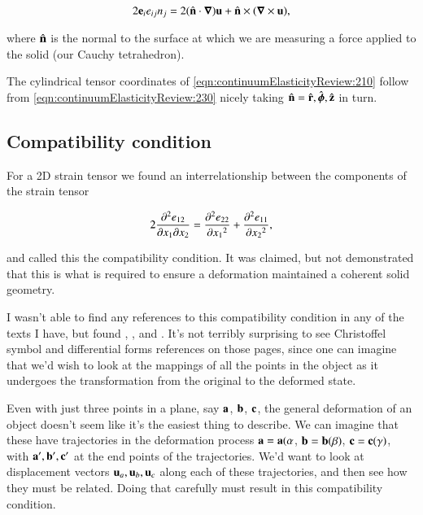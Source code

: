 \begin{equation}\label{eqn:continuumElasticityReview:230}
2 \Be_i e_{ij} n_j = 2 (\ncap \cdot \spacegrad) \Bu + \ncap \cross (\spacegrad \cross \Bu),
\end{equation}

where $\ncap$ is the normal to the surface at which we are measuring a force applied to the solid (our Cauchy tetrahedron).

The cylindrical tensor coordinates of \ref{eqn:continuumElasticityReview:210} follow from 
\ref{eqn:continuumElasticityReview:230} nicely taking $\ncap = \rcap, \phicap, \zcap$ in turn.

\subsection{Compatibility condition}

For a 2D strain tensor we found an interrelationship between the components of the strain tensor

\begin{equation}\label{eqn:continuumElasticityReview:510}
2 \frac{\partial^2 e_{12}}{\partial x_1 \partial x_2} 
=
\PDSq{x_1}{e_{22}} 
+\PDSq{x_2}{e_{11}},
\end{equation}

and called this the compatibility condition.  It was claimed, but not demonstrated that this is what is required to ensure a deformation maintained a coherent solid geometry.

I wasn't able to find any references to this compatibility condition in any of the texts I have, but found \cite{wiki:compatibilityMechanics}, \cite{wiki:infinitesimalStrainTheory}, and \cite{wiki:saintVenantCompat}.  It's not terribly surprising to see Christoffel symbol and differential forms references on those pages, since one can imagine that we'd wish to look at the mappings of all the points in the object as it undergoes the transformation from the original to the deformed state.

Even with just three points in a plane, say $\Ba$, $\Bb$, $\Bc$, the general deformation of an object doesn't seem like it's the easiest thing to describe.  We can imagine that these have trajectories in the deformation process $\Ba = \Ba(\alpha$, $\Bb = \Bb(\beta)$, $\Bc = \Bc(\gamma)$, with $\Ba', \Bb', \Bc'$ at the end points of the trajectories.  We'd want to look at displacement vectors $\Bu_a, \Bu_b, \Bu_c$ along each of these trajectories, and then see how they must be related.  Doing that carefully must result in this compatibility condition.

